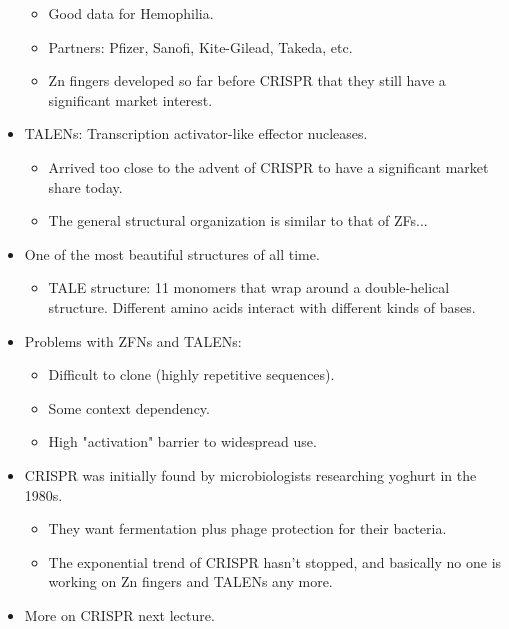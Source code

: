 \documentclass[../notes.tex]{subfiles}
\begin{document}
\begin{itemize}
\begin{itemize}
        \item Good data for Hemophilia.
        \item Partners: Pfizer, Sanofi, Kite-Gilead, Takeda, etc.
        \item Zn fingers developed so far before CRISPR that they still have a significant market interest.
    \end{itemize}
    \item TALENs: Transcription activator-like effector nucleases.
    \begin{itemize}
        \item Arrived too close to the advent of CRISPR to have a significant market share today.
        \item The general structural organization is similar to that of ZFs...
    \end{itemize}
    \item One of the most beautiful structures of all time.
    \begin{itemize}
        \item TALE structure: 11 monomers that wrap around a double-helical structure. Different amino acids interact with different kinds of bases.
    \end{itemize}
    \item Problems with ZFNs and TALENs:
    \begin{itemize}
        \item Difficult to clone (highly repetitive sequences).
        \item Some context dependency.
        \item High "activation" barrier to widespread use.
    \end{itemize}
    \item CRISPR was initially found by microbiologists researching yoghurt in the 1980s.
    \begin{itemize}
        \item They want fermentation plus phage protection for their bacteria.
        \item The exponential trend of CRISPR hasn't stopped, and basically no one is working on Zn fingers and TALENs any more.
    \end{itemize}
    \item More on CRISPR next lecture.
\end{itemize}
\end{document}
